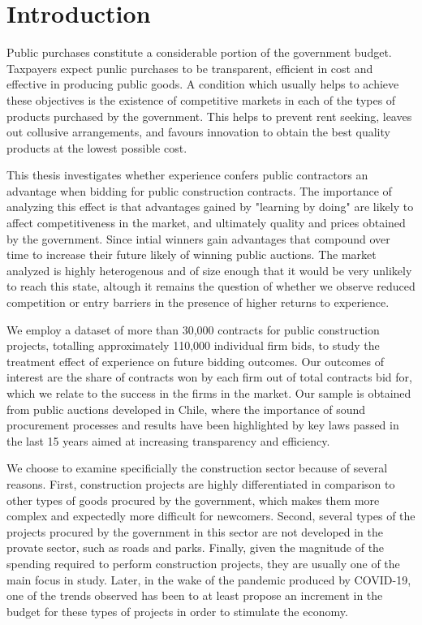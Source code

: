 \chapter{Introduction}
Public purchases constitute a considerable portion of the government budget. Taxpayers expect punlic purchases to be transparent, efficient in cost and effective in producing public goods. A condition which usually helps to achieve these objectives is the existence of competitive markets in each of the types of products purchased by the government. This helps to prevent rent seeking, leaves out collusive arrangements, and favours innovation to obtain the best quality products at the lowest possible cost.

This thesis investigates whether experience confers public contractors an advantage when bidding for public construction contracts. The importance of analyzing this effect is that advantages gained by "learning by doing" are likely to affect competitiveness in the market, and ultimately quality and prices obtained by the government. Since intial winners gain advantages that compound over time to increase their future likely of winning public auctions. The market analyzed is highly heterogenous and of size enough that it would be very unlikely to reach this state, altough it remains the question of whether we observe reduced competition or entry barriers in the presence of higher returns to experience.

We employ a dataset of more than 30,000 contracts for public construction projects, totalling approximately 110,000 individual firm bids, to study the treatment effect of experience on future bidding outcomes. Our outcomes of interest are the share of contracts won by each firm out of total contracts bid for, which we relate to the success in the firms in the market. Our sample is obtained from public auctions developed in Chile, where the importance of sound procurement processes and results have been highlighted by key laws passed in the last 15 years aimed at increasing transparency and efficiency.

We choose to examine specificially the construction sector because of several reasons. First, construction projects are highly differentiated in comparison to other types of goods procured by the government, which makes them more complex and expectedly more difficult for newcomers. Second, several types of the projects procured by the government in this sector are not developed in the provate sector, such as roads and parks. Finally, given the magnitude of the spending required to perform construction projects, they are usually one of the main focus in study. Later, in the wake of the pandemic produced by COVID-19, one of the trends observed has been to at least propose an increment in the budget for these types of projects in order to stimulate the economy.

